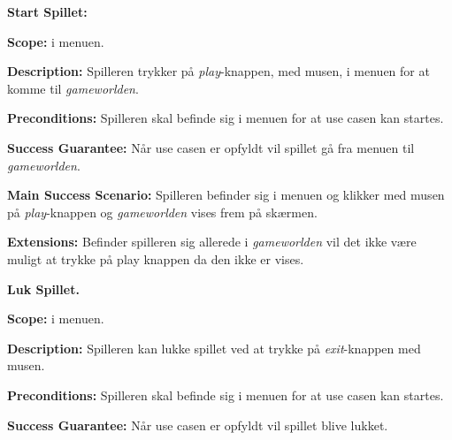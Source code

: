 \textbf{Start Spillet:}\newline

\textbf{Scope:}\newline
i menuen.\newline

\textbf{Description:} \newline
Spilleren trykker på \textit{play}-knappen, med musen, i menuen for at komme til \textit{gameworlden}. \newline

\textbf{Preconditions:}\newline
Spilleren skal befinde sig i menuen for at use casen kan startes.\newline

\textbf{Success Guarantee:}\newline
Når use casen er opfyldt vil spillet gå fra menuen til \textit{gameworlden}.\newline

\textbf{Main Success Scenario:}\newline
Spilleren befinder sig i menuen og klikker med musen på \textit{play}-knappen og \textit{gameworlden} vises frem på skærmen.\newline

\textbf{Extensions:}\newline
Befinder spilleren sig allerede i \textit{gameworlden} vil det ikke være muligt at trykke på play knappen da den ikke er vises.\newline \newline



\textbf{Luk Spillet.}\newline

\textbf{Scope:}\newline
i menuen. \newline

\textbf{Description:} \newline
Spilleren kan lukke spillet ved at trykke på \textit{exit}-knappen med musen.\newline

\textbf{Preconditions:}\newline
Spilleren skal befinde sig i menuen for at use casen kan startes.\newline

\textbf{Success Guarantee:}\newline
Når use casen er opfyldt vil spillet blive lukket. \newline

